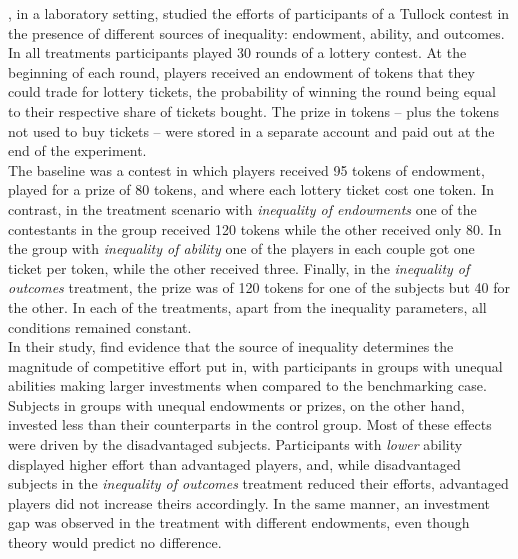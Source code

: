 \cite{fallucchi2017}, in a laboratory setting, studied the efforts of participants of a Tullock contest in the presence of different sources of inequality: endowment, ability, and outcomes. In all treatments participants played 30 rounds of a lottery contest. At the beginning of each round, players received an endowment of tokens that they could trade for lottery tickets, the probability of winning the round being equal to their respective share of tickets bought. The prize in tokens -- plus the tokens not used to buy tickets -- were stored in a separate account and paid out at the end of the experiment.\\

The baseline was a contest in which players received 95 tokens of endowment, played for a prize of 80 tokens, and where each lottery ticket cost one token. In contrast, in the treatment scenario with \textit{inequality of endowments} one of the contestants in the group received 120 tokens while the other received only 80. In the group with \textit{inequality of ability} one of the players in each couple got one ticket per token, while the other received three. Finally, in the \textit{inequality of outcomes} treatment, the prize was of 120 tokens for one of the subjects but 40 for the other. In each of the treatments, apart from the inequality parameters, all conditions remained constant.\\

In their study, \citeauthor{fallucchi2017} find evidence that the source of inequality determines the magnitude of competitive effort put in, with participants in groups with unequal abilities making larger investments when compared to the benchmarking case. Subjects in groups with unequal endowments or prizes, on the other hand, invested less than their counterparts in the control group. Most of these effects were driven by the disadvantaged subjects. Participants with \textit{lower} ability displayed higher effort than advantaged players, and, while disadvantaged subjects in the \textit{inequality of outcomes} treatment reduced their efforts, advantaged players did not increase theirs accordingly. In the same manner, an investment gap was observed in the treatment with different endowments, even though theory would predict no difference.\\

